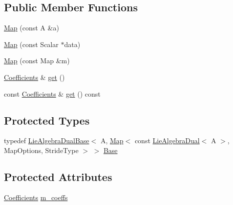 \subsection*{Public Member Functions}
\begin{DoxyCompactItemize}
\item 
\hyperlink{class_map_3_01const_01_lie_algebra_dual_3_01_a_01_4_00_01_map_options_00_01_stride_type_01_4_a3733e2160ea4f13268b2b3e34b33d7c7}{Map} (const A \&a)
\item 
\hyperlink{class_map_3_01const_01_lie_algebra_dual_3_01_a_01_4_00_01_map_options_00_01_stride_type_01_4_ad7a17fb9ef97f7c0dcd412cb97625a88}{Map} (const Scalar $\ast$data)
\item 
\hyperlink{class_map_3_01const_01_lie_algebra_dual_3_01_a_01_4_00_01_map_options_00_01_stride_type_01_4_a8b9ede65605a3251c032c9cb7b4f4c0d}{Map} (const Map \&m)
\item 
\hyperlink{class_map_3_01const_01_lie_algebra_dual_3_01_a_01_4_00_01_map_options_00_01_stride_type_01_4_ae2a817b2902e4bf4f79a40724c8c9341}{Coefficients} \& \hyperlink{class_map_3_01const_01_lie_algebra_dual_3_01_a_01_4_00_01_map_options_00_01_stride_type_01_4_a61b1b1392a7ea136db1a9a7598e76ee0}{get} ()
\item 
const \hyperlink{class_map_3_01const_01_lie_algebra_dual_3_01_a_01_4_00_01_map_options_00_01_stride_type_01_4_ae2a817b2902e4bf4f79a40724c8c9341}{Coefficients} \& \hyperlink{class_map_3_01const_01_lie_algebra_dual_3_01_a_01_4_00_01_map_options_00_01_stride_type_01_4_a13e7ccec6853a91e31f5f209bbb27325}{get} () const
\end{DoxyCompactItemize}
\subsection*{Protected Types}
\begin{DoxyCompactItemize}
\item 
typedef \hyperlink{class_lie_algebra_dual_base}{Lie\+Algebra\+Dual\+Base}$<$ A, \hyperlink{class_map_3_01const_01_lie_algebra_dual_3_01_a_01_4_00_01_map_options_00_01_stride_type_01_4_a3733e2160ea4f13268b2b3e34b33d7c7}{Map}$<$ const \hyperlink{class_lie_algebra_dual}{Lie\+Algebra\+Dual}$<$ A $>$, Map\+Options, Stride\+Type $>$ $>$ \hyperlink{class_map_3_01const_01_lie_algebra_dual_3_01_a_01_4_00_01_map_options_00_01_stride_type_01_4_ae2af81dfcc79fd0a3794e4f13cf9229b}{Base}
\end{DoxyCompactItemize}
\subsection*{Protected Attributes}
\begin{DoxyCompactItemize}
\item 
\hyperlink{class_map_3_01const_01_lie_algebra_dual_3_01_a_01_4_00_01_map_options_00_01_stride_type_01_4_ae2a817b2902e4bf4f79a40724c8c9341}{Coefficients} \hyperlink{class_map_3_01const_01_lie_algebra_dual_3_01_a_01_4_00_01_map_options_00_01_stride_type_01_4_a309ca6ad9fa9ab55a7ec4cc08f136404}{m\+\_\+coeffs}
\end{DoxyCompactItemize}


